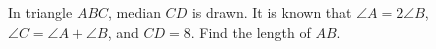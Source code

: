 In triangle $ABC$, median $CD$ is drawn. It is known that $\angle A=2\angle B$, $\angle C=\angle A+\angle B$, and $CD=8$. Find the length of $AB$.
